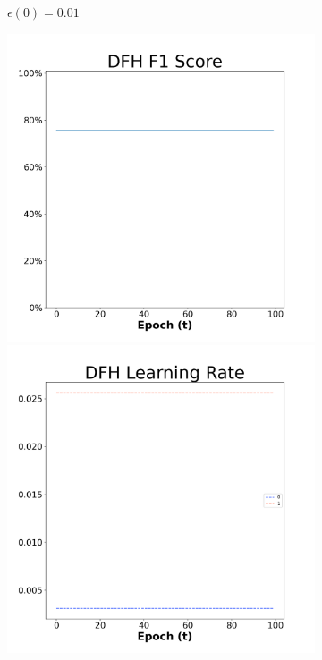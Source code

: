 \begin{figure}[H]
\begin{subfigure}{0.3\textwidth}
  \caption{$\epsilon(0)=0.01$}
\end{subfigure}\hfil %
\begin{subfigure}{0.3\textwidth}
  \includegraphics[width=\linewidth]{images/exper2/NSP/DFH_0.03_f1.png}
  \includegraphics[width=\linewidth]{images/exper2/NSP/DFH_0.03_lr.png}

\end{subfigure}
\end{figure}
